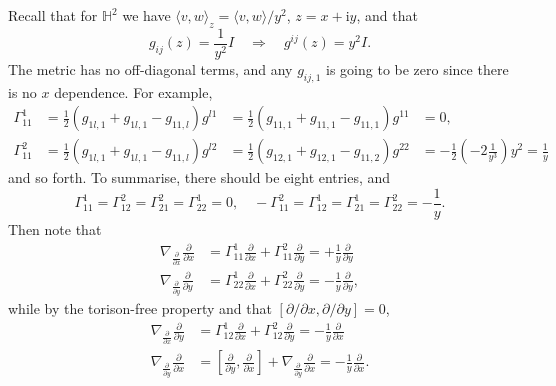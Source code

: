 \documentclass[letter-paper]{tufte-book}
\newenvironment{example}[1][Example]{\begin{trivlist}
\item[\hskip \labelsep {\bfseries #1}]}{\end{trivlist}}
\begin{document}
\begin{example}
  Recall that for $\mathbb{H}^2$ we have $\langle v,w\rangle_z = \langle v, w\rangle / y^2$, $z=x + \mathrm{i}y$, and that
  \begin{equation*}
    g_{ij}(z) = \frac{1}{y^2}I \quad \Rightarrow \quad g^{ij}(z) = y^2 I.
  \end{equation*}
  The metric has no off-diagonal terms, and any $g_{ij,1}$ is going to be zero since there is no $x$ dependence. For example,
  \begin{align*}
    \Gamma_{11}^1 &= \frac{1}{2}(g_{1l,1} + g_{1l,1} - g_{11,l})g^{l1} &= \frac{1}{2}(g_{11,1} + g_{11,1} - g_{11,1})g^{11} &= 0,\\
    \Gamma_{11}^2 &= \frac{1}{2}(g_{1l,1} + g_{1l,1} - g_{11,l})g^{l2} &= \frac{1}{2}(g_{12,1} + g_{12,1} - g_{11,2})g^{22} &= -\frac{1}{2}\left(-2\frac{1}{y^3}\right)y^2 = \frac{1}{y}
  \end{align*}
  and so forth. To summarise, there should be eight entries, and
  \begin{equation*}
    \Gamma_{11}^1 = \Gamma_{12}^2 = \Gamma_{21}^2 = \Gamma_{22}^1 = 0, \quad
   -\Gamma_{11}^2 = \Gamma_{12}^1 = \Gamma_{21}^1 = \Gamma_{22}^2 = -\frac{1}{y}. 
  \end{equation*}
  Then note that
  \begin{align*}
    \nabla_{\frac{\partial}{\partial x}}\frac{\partial}{\partial x} &= \Gamma_{11}^1 \frac{\partial}{\partial x} + \Gamma_{11}^2 \frac{\partial}{\partial y} = +\frac{1}{y}\frac{\partial}{\partial y} \\
    \nabla_{\frac{\partial}{\partial y}}\frac{\partial}{\partial y} &= \Gamma_{22}^1 \frac{\partial}{\partial x} + \Gamma_{22}^2 \frac{\partial}{\partial y} = -\frac{1}{y}\frac{\partial}{\partial y},
  \end{align*}
  while by the torison-free property and that $[\partial / \partial x, \partial / \partial y] = 0$,
  \begin{align*}
    \nabla_{\frac{\partial}{\partial x}}\frac{\partial}{\partial y} &= \Gamma_{12}^1 \frac{\partial}{\partial x} + \Gamma_{12}^2 \frac{\partial}{\partial y} = -\frac{1}{y}\frac{\partial}{\partial x} \\
    \nabla_{\frac{\partial}{\partial y}}\frac{\partial}{\partial x} &= \left[\frac{\partial}{\partial y}, \frac{\partial}{\partial x}\right] + \nabla_{\frac{\partial}{\partial y}}\frac{\partial}{\partial x} =-\frac{1}{y}\frac{\partial}{\partial x}.
  \end{align*}
  

\end{example}
\end{document}
